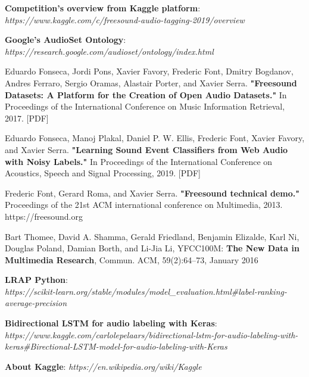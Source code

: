 \documentclass[11pt, a4papper]{report}
\theoremstyle{plain}
\theoremstyle{definition}
\theoremstyle{definition}
\theoremstyle{proposition}
\begin{document}



\begin{thebibliography}{1}
 \textbf{Competition's overview from Kaggle platform}: \\
\textit{https://www.kaggle.com/c/freesound-audio-tagging-2019/overview}

 \textbf{Google’s AudioSet Ontology}: \textit{https://research.google.com/audioset/ontology/index.html}

 Eduardo Fonseca, Jordi Pons, Xavier Favory, Frederic Font, Dmitry Bogdanov, Andres Ferraro, Sergio Oramas, Alastair Porter, and Xavier Serra. \textbf{"Freesound Datasets: A Platform for the Creation of Open Audio Datasets."} In Proceedings of the International Conference on Music Information Retrieval, 2017. [PDF]

 Eduardo Fonseca, Manoj Plakal, Daniel P. W. Ellis, Frederic Font, Xavier Favory, and Xavier Serra. \textbf{"Learning Sound Event Classifiers from Web Audio with Noisy Labels."} In Proceedings of the International Conference on Acoustics, Speech and Signal Processing, 2019. [PDF]

 Frederic Font, Gerard Roma, and Xavier Serra. \textbf{"Freesound technical demo."} Proceedings of the 21st ACM international conference on Multimedia, 2013. https://freesound.org

 Bart Thomee, David A. Shamma, Gerald Friedland, Benjamin Elizalde, Karl Ni, Douglas Poland, Damian Borth, and Li-Jia Li, YFCC100M: \textbf{The New Data in Multimedia Research}, Commun. ACM, 59(2):64–73, January 2016

 \textbf{LRAP Python}: \\
 \textit{https://scikit-learn.org/stable/modules/model\_evaluation.html\#label-ranking-average-precision}
 
 \textbf{Bidirectional LSTM for audio labeling with Keras}: \\
\textit{https://www.kaggle.com/carlolepelaars/bidirectional-lstm-for-audio-labeling-with-keras\#Birectional-LSTM-model-for-audio-labeling-with-Keras}

 \textbf{About Kaggle}: \textit{https://en.wikipedia.org/wiki/Kaggle}


\end{thebibliography}
\end{document}
